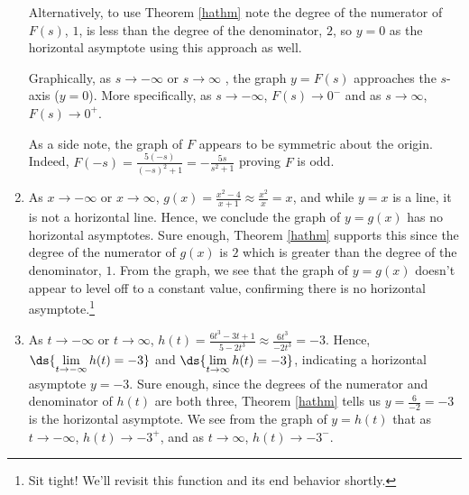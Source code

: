 \documentclass{ximera}
\begin{document}
\begin{example}
\begin{enumerate}
Alternatively, to use Theorem \ref{hathm} note the degree of the numerator of  $F(s)$,  $1$, is less than the degree of the denominator, $2$,  so  $y=0$ as the horizontal asymptote using this approach as well.

Graphically, as $s \rightarrow  -\infty$ or $s \rightarrow  \infty$ , the graph $y = F(s)$ approaches the $s$-axis ($y = 0$).  More specifically, as $s \rightarrow -\infty$, $F(s)  \rightarrow 0^{-}$ and as $s \rightarrow \infty$, $F(s)  \rightarrow 0^{+}$.  

As a side note, the graph of $F$ appears to be symmetric about the origin.  Indeed, $F(-s) = \frac{5(-s)}{(-s)^2+1} = -\frac{5s}{s^2+1}$ proving $F$ is odd.

\begin{center}
\end{center} 

\item  As $x \rightarrow  -\infty$ or $x \rightarrow \infty$, $g(x) = \frac{x^2-4}{x+1} \approx \frac{x^2}{x} = x$, and while $y = x$ is a line, it is not a horizontal line.  Hence, we conclude the graph of $y = g(x)$ has no horizontal asymptotes.  Sure enough,  Theorem \ref{hathm} supports this since the degree of the numerator of $g(x)$ is $2$ which is greater than the degree of the denominator, $1$.   From the graph, we see that the graph of $y=g(x)$ doesn't appear to level off to a constant value, confirming there is no horizontal asymptote.\footnote{Sit tight!  We'll revisit this function and its end behavior shortly.}

\begin{center}
\end{center} 

\item   As $t \rightarrow -\infty$ or $t \rightarrow \infty$,  $h(t) = \frac{6t^3-3t+1}{5-2t^3} \approx  \frac{6t^3}{-2t^3} = -3$.  Hence, $\ds{\lim_{t \rightarrow  -\infty} h(t) = -3}$ and $\ds{\lim_{t \rightarrow  \infty} h(t) = -3}$, indicating a horizontal asymptote $y = -3$.  Sure enough, since the degrees of the numerator and denominator of $h(t)$ are both three,  Theorem \ref{hathm} tells us $y = \frac{6}{-2} = -3$ is the horizontal asymptote.  We see from the graph of $y = h(t)$ that as $t \rightarrow -\infty$, $h(t) \rightarrow -3^{+}$, and as $t \rightarrow \infty$, $h(t) \rightarrow -3^{-}$.


\end{enumerate}
\end{example}
\end{document}
